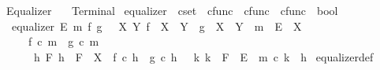 %
\begin{isabellebody}%
%
%
\isadelimtheory
%
\endisadelimtheory
%
\isatagtheory
{}\isamarkupfalse%
\ Equalizer\isanewline
\ \ \ Terminal\isanewline
{}%
\endisatagtheory
{\isafoldtheory}%
%
\isadelimtheory
%
\endisadelimtheory
%
\isadelimdocument
%
\endisadelimdocument
%
\isatagdocument
%
\isamarkuptrue%
%
\isamarkuptrue%
%
\endisatagdocument
{\isafolddocument}%
%
\isadelimdocument
%
\endisadelimdocument
{}\isamarkupfalse%
\ equalizer\ {\isacharcolon}{\kern0pt}{\isacharcolon}{\kern0pt}\ {\isachardoublequoteopen}cset\ {\isasymRightarrow}\ cfunc\ {\isasymRightarrow}\ cfunc\ {\isasymRightarrow}\ cfunc\ {\isasymRightarrow}\ bool{\isachardoublequoteclose}\ \isanewline
\ \ {\isachardoublequoteopen}equalizer\ E\ m\ f\ g\ {\isasymlongleftrightarrow}\ {\isacharparenleft}{\kern0pt}{\isasymexists}\ X\ Y{\isachardot}{\kern0pt}\ {\isacharparenleft}{\kern0pt}f\ {\isacharcolon}{\kern0pt}\ X\ {\isasymrightarrow}\ Y{\isacharparenright}{\kern0pt}\ {\isasymand}\ {\isacharparenleft}{\kern0pt}g\ {\isacharcolon}{\kern0pt}\ X\ {\isasymrightarrow}\ Y{\isacharparenright}{\kern0pt}\ {\isasymand}\ {\isacharparenleft}{\kern0pt}m\ {\isacharcolon}{\kern0pt}\ E\ {\isasymrightarrow}\ X{\isacharparenright}{\kern0pt}\isanewline
\ \ \ \ {\isasymand}\ {\isacharparenleft}{\kern0pt}f\ {\isasymcirc}\isactrlsub c\ m\ {\isacharequal}{\kern0pt}\ g\ {\isasymcirc}\isactrlsub c\ m{\isacharparenright}{\kern0pt}\isanewline
\ \ \ \ {\isasymand}\ {\isacharparenleft}{\kern0pt}{\isasymforall}\ h\ F{\isachardot}{\kern0pt}\ {\isacharparenleft}{\kern0pt}{\isacharparenleft}{\kern0pt}h\ {\isacharcolon}{\kern0pt}\ F\ {\isasymrightarrow}\ X{\isacharparenright}{\kern0pt}\ {\isasymand}\ {\isacharparenleft}{\kern0pt}f\ {\isasymcirc}\isactrlsub c\ h\ {\isacharequal}{\kern0pt}\ g\ {\isasymcirc}\isactrlsub c\ h{\isacharparenright}{\kern0pt}{\isacharparenright}{\kern0pt}\ {\isasymlongrightarrow}\ {\isacharparenleft}{\kern0pt}{\isasymexists}{\isacharbang}{\kern0pt}\ k{\isachardot}{\kern0pt}\ {\isacharparenleft}{\kern0pt}k\ {\isacharcolon}{\kern0pt}\ F\ {\isasymrightarrow}\ E{\isacharparenright}{\kern0pt}\ {\isasymand}\ m\ {\isasymcirc}\isactrlsub c\ k\ {\isacharequal}{\kern0pt}\ h{\isacharparenright}{\kern0pt}{\isacharparenright}{\kern0pt}{\isacharparenright}{\kern0pt}{\isachardoublequoteclose}\isanewline
\isanewline
{}\isamarkupfalse%
\ equalizer{\isacharunderscore}{\kern0pt}def{}{\isacharcolon}{\kern0pt}\isanewline

\end{isabellebody}
